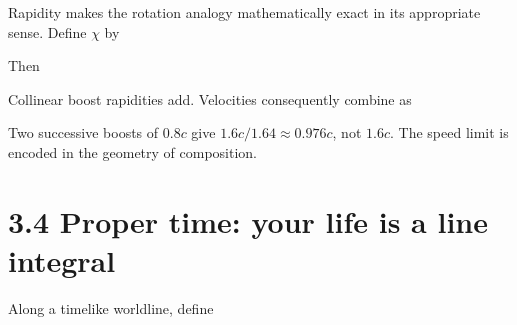 \documentclass[
  11pt,
  letterpaper,
  oneside,
  openany]{scrbook}
\begin{document}
Rapidity makes the rotation analogy mathematically exact in its
appropriate sense. Define \(\chi\) by

\begin{center}
\begingroup
{}
\ifdim\wd\grmathbox>\linewidth
\resizebox{\linewidth}{!}{\usebox{\grmathbox}}
\else\usebox{\grmathbox}\fi
\endgroup
\end{center}

Then

\begin{center}
\begingroup
{}
\ifdim\wd\grmathbox>\linewidth
\resizebox{\linewidth}{!}{\usebox{\grmathbox}}
\else\usebox{\grmathbox}\fi
\endgroup
\end{center}

Collinear boost rapidities add. Velocities consequently combine as

\begin{center}
\begingroup
{}
\ifdim\wd\grmathbox>\linewidth
\resizebox{\linewidth}{!}{\usebox{\grmathbox}}
\else\usebox{\grmathbox}\fi
\endgroup
\end{center}

Two successive boosts of \(0.8c\) give \(1.6c/1.64\approx0.976c\), not
\(1.6c\). The speed limit is encoded in the geometry of composition.

\hypertarget{proper-time-your-life-is-a-line-integral}{%
\section{3.4 Proper time: your life is a line
integral}\label{proper-time-your-life-is-a-line-integral}}

Along a timelike worldline, define
\end{document}
